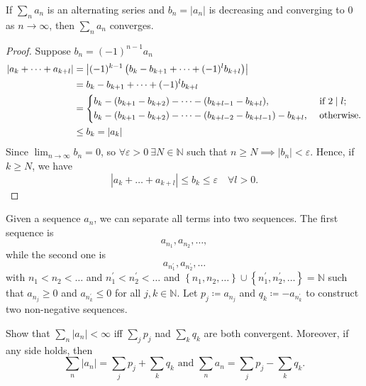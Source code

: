 \begin{theorem}
    If \(\sum_{n} a_n\) is an alternating series and \(b_n = \vert a_n \vert \) is decreasing and converging to \(0\) as \(n \to \infty \), then \(\sum_{n} a_n \) converges.     
\end{theorem}
\begin{proof}
    Suppose \(b_n = (-1)^{n-1} a_n \)
    \begin{align*}
        \left\vert a_k + \dots + a_{k+l} \right\vert  &= \left\vert  (-1)^{k-1} \left( b_k - b_{k+1} + \dots + (-1)^l b_{k+l} \right) \right\vert \\
        &= b_k - b_{k+1} + \dots + (-1)^l b_{k+l} \\ &= 
        \begin{dcases}
            b_k - (b_{k+1} - b_{k+2}) - \dots - (b_{k + l - 1} - b_{k+l}), &\text{ if } 2 \mid l  ;\\
            b_k - (b_{k+1} - b_{k+2}) - \dots - (b_{k+l-2} - b_{k+l-1}) - b_{k+l}, &\text{ otherwise}.
        \end{dcases} \\
        & \le b_k = \vert a_k \vert 
    \end{align*}
    Since \(\lim_{n \to \infty} b_n = 0 \), so \(\forall \varepsilon > 0 \ \exists N \in \mathbb{N} \) such that \(n \ge N \implies \vert b_n \vert < \varepsilon  \). Hence, if \(k \ge N\), we have 
    \[
        \left\vert a_k + \dots + a_{k+l}  \right\vert \le b_k \le \varepsilon \quad \forall l > 0. 
    \] 
\end{proof}

Given a sequence \(a_n\), we can separate all terms into two sequences. The first sequence is 
\[
    a_{n_1}, a_{n_2}, \dots,
\] while the second one is 
\[
    a_{n_1^{\prime} }, a_{n_2^{\prime} }, \dots 
\] with \(n_1 < n_2 < \dots \) and \(n_1^{\prime} < n_2^{\prime} < \dots \) and \(\left\{ n_1, n_2, \dots \right\} \cup \left\{ n_1^{\prime} , n_2^{\prime} , \dots  \right\}  = \mathbb{N} \) such that \(a_{n_j} \ge 0\) and \(a_{n_k^{\prime} } \le 0\) for all \(j, k \in \mathbb{N} \). Let \(p_j \coloneqq a_{n_j}\) and \(q_k \coloneqq -a_{n_k^{\prime} }\) to construct two non-negative sequences.  

\begin{exercise}
    Show that \(\sum_{n} \vert a_n \vert < \infty  \) iff \(\sum_{j} p_j \) nad \(\sum_{k} q_k \) are both convergent. Moreover, if any side holds, then
    \[
        \sum_{n} \vert a_n \vert = \sum_{j} p_j + \sum_{k} q_k \text{ and } \sum_{n} a_n = \sum_{j} p_j - \sum_{k} q_k.       
    \]   
\end{exercise}

